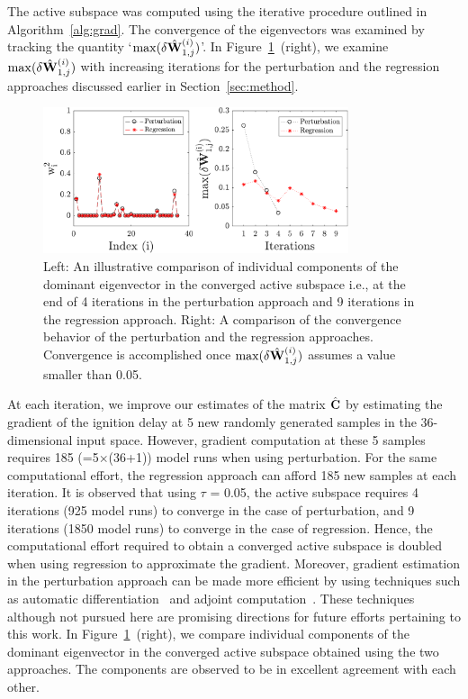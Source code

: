 The active subspace was computed using the iterative procedure outlined in 
Algorithm~\ref{alg:grad}. The convergence of the eigenvectors was examined
by tracking the quantity `$\max(\delta \hat{\mathbf{{W}}}_{1,j}^{(i)})$'. 
In Figure~\ref{fig:conv_app}~(right), we examine $\max(\delta \hat{\mathbf{{W}}}_{1,j}^{(i)})$
with increasing iterations for the perturbation and the regression approaches 
discussed earlier in Section~\ref{sec:method}. 
%
\begin{figure}[htbp]
 \begin{center}
  \includegraphics[width=0.8\textwidth]{eig_conv36Dp2}
\caption{Left: An illustrative comparison of individual components of the 
dominant eigenvector in the converged active subspace i.e., at the end
of 4 iterations in the perturbation approach and 9 iterations in the
regression approach. Right: A comparison of the convergence behavior
of the perturbation and the
regression approaches. Convergence is accomplished once 
$\max(\delta \hat{\mathbf{{W}}}_{1,j}^{(i)})$ assumes a value smaller
than 0.05.}
\label{fig:conv_app}
\end{center}
\end{figure}
%
At each iteration, we improve our estimates of the matrix $\hat{\mathbf{{C}}}$ by
estimating the gradient of the ignition delay at 5 new randomly generated samples 
in the 36-dimensional input space. However, gradient computation at these
5 samples requires 185 (=5$\times$(36+1)) model runs when using perturbation. 
For the same computational effort, the regression approach can afford 185 new
samples at each iteration. It is observed that using $\tau$ = 0.05, the 
active subspace requires 4 iterations (925 model runs) to converge in the case of perturbation, and
9 iterations (1850 model runs) to converge in the case of regression. Hence, the computational effort
required to obtain a converged active subspace is doubled when using
regression to approximate the gradient. Moreover, gradient estimation in the perturbation approach
can be made more efficient by using techniques such as automatic differentiation~\cite{Kiparissides:2009}
and adjoint computation~\cite{Jameson:1988}. These techniques although not pursued here are 
promising directions for
future efforts pertaining to this work. In Figure~\ref{fig:conv_app}~(right), we compare
individual components of the dominant eigenvector in the converged active subspace
obtained using the two approaches. The components are observed to be in excellent
agreement with each other.

